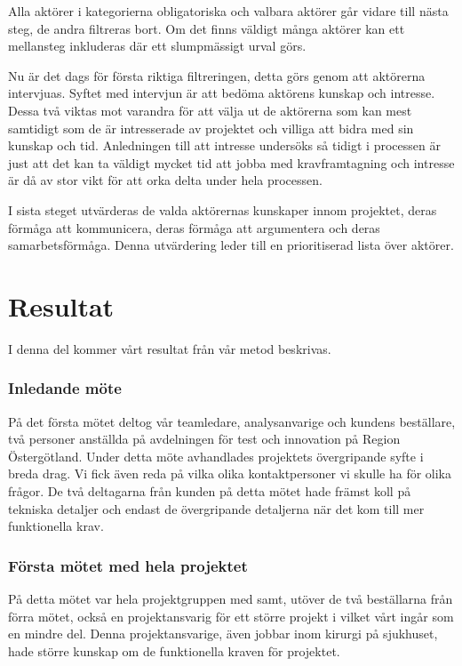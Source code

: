 Alla aktörer i kategorierna obligatoriska och valbara aktörer går vidare till nästa steg, de andra filtreras bort. Om det finns väldigt många aktörer kan ett mellansteg inkluderas där ett slumpmässigt urval görs.

Nu är det dags för första riktiga filtreringen, detta görs genom att aktörerna intervjuas. Syftet med intervjun är att bedöma aktörens kunskap och intresse. Dessa två viktas mot varandra för att välja ut de aktörerna som kan mest samtidigt som de är intresserade av projektet och villiga att bidra med sin kunskap och tid. Anledningen till att intresse undersöks så tidigt i processen är just att det kan ta väldigt mycket tid att jobba med kravframtagning och intresse är då av stor vikt för att orka delta under hela processen. 

I sista steget utvärderas de valda aktörernas kunskaper innom projektet, deras förmåga att kommunicera, deras förmåga att argumentera och deras samarbetsförmåga. Denna utvärdering leder till en prioritiserad lista över aktörer.

\section{Resultat}
I denna del kommer vårt resultat från vår metod beskrivas.

\subsubsection{Inledande möte}
På det första mötet deltog vår teamledare, analysanvarige och kundens beställare, två personer anställda på avdelningen för test och innovation på Region Östergötland. Under detta möte avhandlades projektets övergripande syfte i breda drag.
Vi fick även reda på vilka olika kontaktpersoner vi skulle ha för olika frågor. De två deltagarna från kunden på detta mötet hade främst koll på tekniska detaljer och endast de övergripande detaljerna när det kom till mer funktionella krav.

\subsubsection{Första mötet med hela projektet}
På detta mötet var hela projektgruppen med samt, utöver de två beställarna från förra mötet, också en projektansvarig för ett större projekt i vilket vårt ingår som en mindre del. Denna projektansvarige, även jobbar inom kirurgi på sjukhuset, hade större kunskap om de funktionella kraven för projektet.

